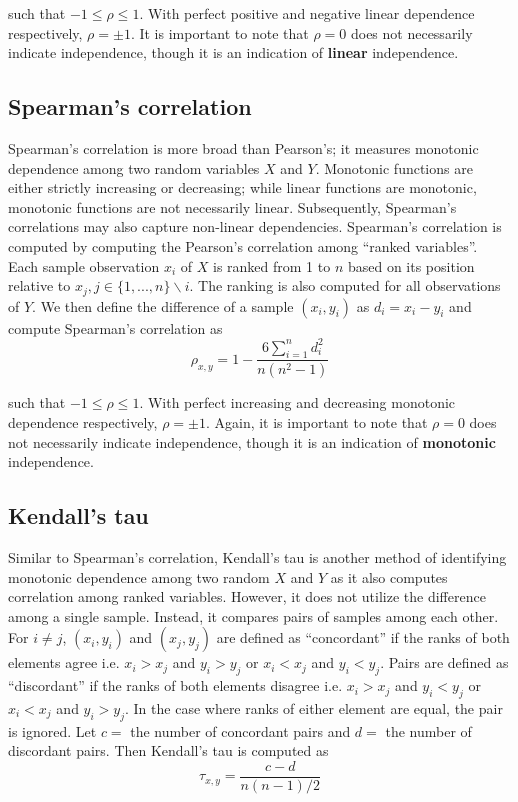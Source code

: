 \noindent such that $-1 \leq \rho \leq 1$. With perfect positive and negative 
linear 
dependence respectively, $\rho=\pm1$.
It is important to note that $\rho=0$ does not necessarily indicate
independence, though it is an indication of \textbf{linear} independence.

\subsection{Spearman's correlation}

Spearman's correlation is more broad than Pearson's; it measures monotonic
dependence among two random variables $X$ and $Y$. Monotonic functions are
either strictly increasing or decreasing; while linear functions are monotonic,
monotonic functions are not necessarily linear. Subsequently, Spearman's
correlations may also capture non-linear dependencies. Spearman's correlation is
computed by computing the Pearson's correlation among ``ranked variables''. Each
sample observation $x_i$ of $X$ is ranked from 1 to $n$ based on its position
relative to $x_j, j\in\{1,...,n\}\backslash{i}$. The ranking is also computed
for all observations of $Y$. We then define the difference of a sample
$(x_i,y_i)$ as $d_i=x_i-y_i$ and compute Spearman's correlation as
$$\rho_{x,y}=1-\frac{6 \sum\limits_{i=1}^{n}d_i^2}{n(n^2-1)}$$

\noindent such that $-1 \leq \rho \leq 1$. With perfect increasing and 
decreasing 
monotonic dependence respectively,
$\rho=\pm1$. Again, it is important to note that $\rho=0$ does not necessarily
indicate independence, though it is an indication of \textbf{monotonic}
independence.

\subsection{Kendall's tau}

Similar to Spearman's correlation, Kendall's tau is another method of
identifying monotonic dependence among two random $X$ and $Y$ as it also
computes correlation among ranked variables. However, it does not utilize the
difference among a single sample. Instead, it compares pairs of samples among
each other. For $i\not=j$, $(x_i,y_i)$ and $(x_j,y_j)$ are defined as
``concordant'' if the ranks of both elements agree i.e. $x_i > x_j$ and $y_i >
y_j$ or $x_i < x_j$ and $y_i < y_j$. Pairs are defined as ``discordant'' if the
ranks of both elements disagree i.e. $x_i > x_j$ and $y_i < y_j$ or $x_i < x_j$
and $y_i > y_j$. In the case where ranks of either element are equal, the pair
is ignored. Let $c=$ the number of concordant pairs and $d=$ the number of
discordant pairs. Then Kendall's tau is computed as 
$$\tau_{x,y}=\frac{c-d}{n(n-1)/2}$$

